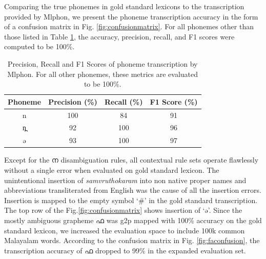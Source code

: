 Comparing the true phonemes in gold standard lexicons to the transcription
provided by Mlphon, we present the phoneme transcription accuracy in the form
of a confusion matrix in Fig. \ref{fig:confusionmatrix}. For all phonemes other
than those listed in Table \ref{tab:precision}, the accuracy, precision, recall,
and F1 scores were computed to be 100\%. \vspace{0.2cm}

\begin{table}[htpb]
	\begin{center}
		\caption{Precision, Recall and F1 Scores of phoneme transcription by Mlphon. For all other phonemes, these metrics are evaluated to be 100\%.}
		\label{tab:precision}
		\begin{tabular}{@{}cccc@{}}
			\hline\hline
			Phoneme  & Precision (\%) & Recall (\%) & F1 Score (\%) \\
			\hline
			{\ipa n} & 100            & 84          & 91            \\
			{\ipa n̪} & 92             & 100         & 96            \\
			{\ipa ə} & 93             & 100         & 97            \\

			\hline
		\end{tabular}
	\end{center}
\end{table}

Except for the {\mal ന} disambiguation rules, all contextual rule sets operate
flawlessly without a single error when evaluated on gold standard lexicon. The
unintentional insertion of \textit{samvruthokaram} into non native proper names
and abbreviations transliterated from English was the cause of all the
insertion errors. Insertion is mapped to the empty symbol `\#' in the gold
standard transcription. The top row of the Fig.\ref{fig:confusionmatrix} shows
insertion of `{\ipa ə}'. Since the mostly ambiguous grapheme {\mal ഫ} was \gls{g2p}
mapped with 100\% accuracy on the gold standard lexicon, we increased the
evaluation space to include 100k common Malayalam words. According to the
confusion matrix in Fig. \ref{fig:faconfusion}, the transcription accuracy of {\mal
		ഫ} dropped to 99\% in the expanded evaluation set.



